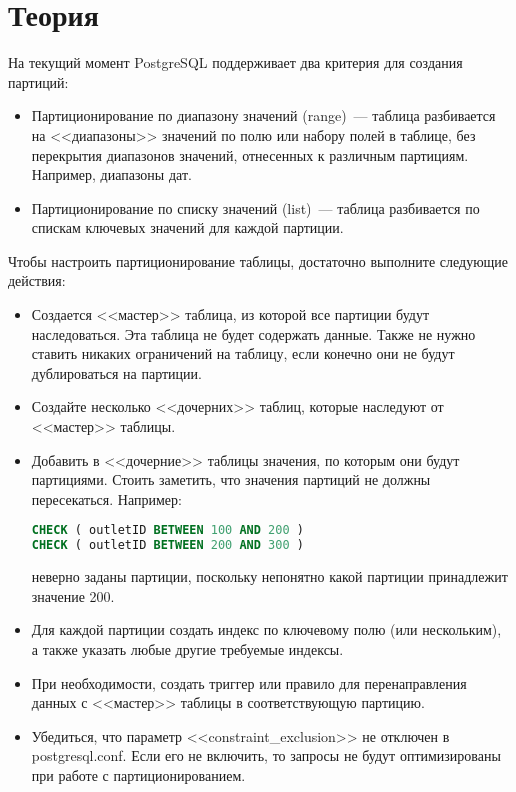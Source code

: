 \section{Теория}
На текущий момент PostgreSQL поддерживает два критерия для создания партиций:
\begin{itemize}
\item Партиционирование по диапазону значений (range)~--- таблица разбивается на <<диапазоны>> значений по полю или набору полей
в таблице, без перекрытия диапазонов значений, отнесенных к различным партициям. Например, диапазоны дат.
\item Партиционирование по списку значений (list)~--- таблица разбивается по спискам ключевых значений для каждой партиции.
\end{itemize}

Чтобы настроить партиционирование таблицы, достаточно выполните следующие действия:
\begin{itemize}
\item Создается <<мастер>> таблица, из которой все партиции будут наследоваться. Эта таблица не будет содержать данные.
Также не нужно ставить никаких ограничений на таблицу, если конечно они не будут дублироваться на партиции.
\item Создайте несколько <<дочерних>> таблиц, которые наследуют от <<мастер>> таблицы.
\item Добавить в <<дочерние>> таблицы значения, по которым они будут партициями.
Стоить заметить, что значения партиций не должны пересекаться. Например:
\begin{lstlisting}[language=SQL,label=lst:partitioning1,caption=Пример неверного задания значений партиций]
CHECK ( outletID BETWEEN 100 AND 200 )
CHECK ( outletID BETWEEN 200 AND 300 )
\end{lstlisting}
неверно заданы партиции, поскольку непонятно какой партиции принадлежит значение 200.
\item Для каждой партиции создать индекс по ключевому полю (или нескольким), а также указать любые другие требуемые индексы.
\item При необходимости, создать триггер или правило для перенаправления данных с <<мастер>> таблицы в соответствующую партицию.
\item Убедиться, что параметр <<constraint\_exclusion>> не отключен в postgresql.conf. Если его не включить, то запросы не будут
оптимизированы при работе с партиционированием.
\end{itemize}

